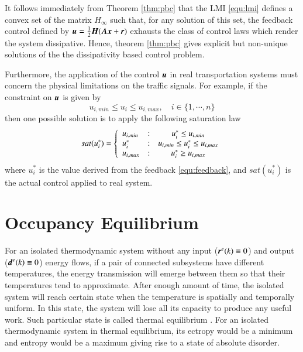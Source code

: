 \documentclass[preprint,authoryear,12pt]{elsarticle}
\renewcommand{\vec}[1]{\mbox{\boldmath$#1$}}
\newcommand{\mat}[1]{\mbox{\boldmath$#1$}}
\begin{document}
It follows immediately from Theorem \ref{thm:pbc} that the LMI
\eqref{equ:lmi} defines a convex set of the matrix $H_\infty$ such
that, for any solution of this set, the feedback control defined by
$\vec{u}=\frac{1}{2} \mat{H} (\mat{A}\vec{x}+\vec{r})$ exhausts the
class of control laws which render the system dissipative.
Hence, theorem \ref{thm:pbc} gives explicit but non-unique solutions
of the the dissipativity based control problem.

\newpage

Furthermore, the application of the control $\vec{u}$ in real
transportation systems must concern the physical limitations on the
traffic signals. For example, if the constraint on $\vec{u}$ is given
by
$$u_{i,min}\le u_i\le u_{i,max},\quad i\in\{1,\cdots,n\}
$$
then one possible solution is to apply the following saturation law
\begin{equation}
sat(u_i^*) = \left\{ \begin{array}{l@{\quad:\quad}c}
        u_{i,min} & u_i^*\le u_{i,min}\\
        u_i^* & u_{i,min}\le u_i^*\le u_{i,max}\\
        u_{i,max} & u_i^*\ge u_{i,max}
        \end{array}\right.
\end{equation}
where $u_i^*$ is the value derived from the feedback
\eqref{equ:feedback}, and $sat(u_i^*)$ is the actual control applied
to real system.

\newpage

\section{Occupancy Equilibrium}\label{sec:equilibrium}

For an isolated thermodynamic system without any input
($\vec{r}^e(k)\equiv 0$) and output ($\vec{d}^e(k)\equiv 0$) energy
flows, if a pair of connected subsystems have different temperatures,
the energy transmission will emerge between them so that their
temperatures tend to approximate. After enough amount of time, the
isolated system will reach certain state when the temperature is
spatially and temporally uniform. In this state, the system will lose
all its capacity to produce any useful work. Such particular state is
called thermal equilibrium \citep{cengel_thermodynamics:_2001}. For
an isolated thermodynamic system in thermal equilibrium, its ectropy
would be a minimum and entropy would be a maximum giving rise to a
state of absolute disorder.
\end{document}
